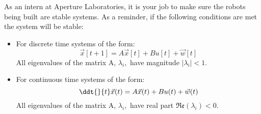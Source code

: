 

As an intern at Aperture Laboratories, it is your job to make sure the robots being built are stable systems.
As a reminder, if the following conditions are met the system will be stable:

\begin{itemize}

\item For discrete time systems of the form:
\begin{equation}
\vec{x}[t+1] = A\vec{x}[t] + Bu[t] + \vec{w}[t]
\end{equation}
All eigenvalues of the matrix A, $\lambda_{i},$ have magnitude $|\lambda_{i}| < 1.$

\item For continuous time systems of the form:
\begin{equation}
\ddt{}{t} \vec{x}(t) = A\vec{x}(t) + Bu(t)+ \vec{w}(t)
\end{equation}
All eigenvalues of the matrix A, $\lambda_{i},$ have real part $\mathfrak{Re}(\lambda_{i})< 0.$
\end{itemize}

